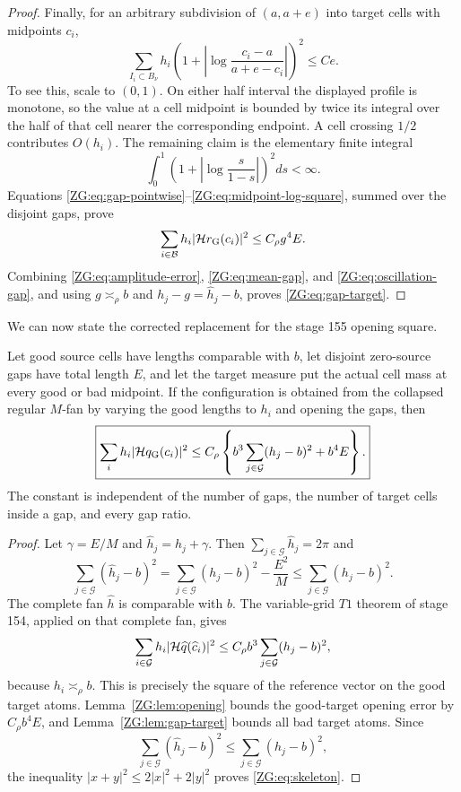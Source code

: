 \begin{proof}
Finally, for an arbitrary subdivision of $(a,a+e)$ into target cells
with midpoints $c_i$,
\begin{equation}\label{ZG:eq:midpoint-log-square}
 \sum_{I_i\subset B_\nu}h_i
 \left(1+\left|\log
 \frac{c_i-a}{a+e-c_i}\right|\right)^2
 \le Ce.
\end{equation}
To see this, scale to $(0,1)$.  On either half interval the displayed
profile is monotone, so the value at a cell midpoint is bounded by twice
its integral over the half of that cell nearer the corresponding
endpoint.  A cell crossing $1/2$ contributes $O(h_i)$.  The remaining
claim is the elementary finite integral
\[
 \int_0^1\left(1+\left|\log\frac{s}{1-s}\right|\right)^2ds<\infty.
\]
Equations \eqref{ZG:eq:gap-pointwise}--\eqref{ZG:eq:midpoint-log-square},
summed over the disjoint gaps, prove
\begin{equation}\label{ZG:eq:oscillation-gap}
 \sum_{i\in\mathcal B}h_i|\mathcal H r_{\rm G}(c_i)|^2
 \le C_\rho g^4E.
\end{equation}
Combining \eqref{ZG:eq:amplitude-error}, \eqref{ZG:eq:mean-gap}, and
\eqref{ZG:eq:oscillation-gap}, and using $g\asymp_\rho b$ and
$h_j-g=\widehat h_j-b$, proves \eqref{ZG:eq:gap-target}.
\end{proof}

We can now state the corrected replacement for the stage 155 opening
square.

\begin{lemma}\label{ZG:lem:skeleton}
Let good source
cells have lengths comparable with $b$, let disjoint
zero-source gaps have total length $E$, and let the target measure put
the actual cell mass at every good or bad midpoint.  If the configuration
is obtained from the collapsed regular $M$-fan by varying the good
lengths to $h_i$ and opening the gaps, then
\begin{equation}\label{ZG:eq:skeleton}
 \boxed{
 \sum_i h_i|\mathcal H q_{\rm G}(c_i)|^2
 \le C_\rho\left\{
 b^3\sum_{j\in\mathcal G}(h_j-b)^2+b^4E\right\}.}
\end{equation}
The constant is independent of the number of gaps, the number of
target cells inside a gap, and every gap ratio.
\end{lemma}

\begin{proof}
Let $\gamma=E/M$ and $\widehat h_j=h_j+\gamma$.  Then
$\sum_{j\in\mathcal G}\widehat h_j=2\pi$ and
\[
 \sum_{j\in\mathcal G}(\widehat h_j-b)^2
 =\sum_{j\in\mathcal G}(h_j-b)^2-\frac{E^2}{M}
 \le\sum_{j\in\mathcal G}(h_j-b)^2.
\]
The complete fan $\widehat h$ is comparable with $b$.  The variable-grid
$T1$ theorem of stage 154, applied on that complete fan, gives
\[
 \sum_{i\in\mathcal G}h_i
 |\mathcal H\widehat q(\widehat c_i)|^2
 \le C_\rho b^3
 \sum_{j\in\mathcal G}(h_j-b)^2,
\]
because $h_i\asymp_\rho b$.  This is precisely the square of the
reference vector on the good target atoms.  Lemma~\ref{ZG:lem:opening}
bounds the good-target opening error by $C_\rho b^4E$, and
Lemma~\ref{ZG:lem:gap-target} bounds all bad target atoms.  Since
\[
 \sum_{j\in\mathcal G}(\widehat h_j-b)^2
 \le\sum_{j\in\mathcal G}(h_j-b)^2,
\]
the inequality $|x+y|^2\le2|x|^2+2|y|^2$ proves
\eqref{ZG:eq:skeleton}.
\end{proof}

